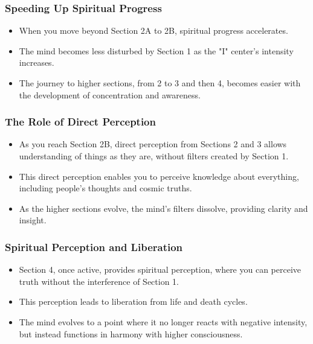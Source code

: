 \begin{frame}[fragile]\frametitle{Speeding Up Spiritual Progress}
    \begin{itemize}
        \item When you move beyond Section 2A to 2B, spiritual progress accelerates.
        \item The mind becomes less disturbed by Section 1 as the "I" center's intensity increases.
        \item The journey to higher sections, from 2 to 3 and then 4, becomes easier with the development of concentration and awareness.
    \end{itemize}
\end{frame}

\begin{frame}[fragile]\frametitle{The Role of Direct Perception}
    \begin{itemize}
        \item As you reach Section 2B, direct perception from Sections 2 and 3 allows understanding of things as they are, without filters created by Section 1.
        \item This direct perception enables you to perceive knowledge about everything, including people’s thoughts and cosmic truths.
        \item As the higher sections evolve, the mind’s filters dissolve, providing clarity and insight.
    \end{itemize}
\end{frame}

\begin{frame}[fragile]\frametitle{Spiritual Perception and Liberation}
    \begin{itemize}
        \item Section 4, once active, provides spiritual perception, where you can perceive truth without the interference of Section 1.
        \item This perception leads to liberation from life and death cycles.
        \item The mind evolves to a point where it no longer reacts with negative intensity, but instead functions in harmony with higher consciousness.
    \end{itemize}
\end{frame}

